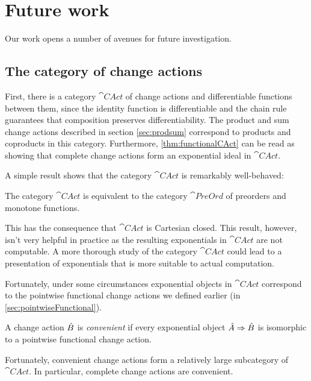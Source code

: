 \section{Future work}

Our work opens a number of avenues for future investigation.

\subsection{The category of change actions}

First, there is a category $\cat{CAct}$ of change actions and differentiable
functions between them, since the identity function is differentiable and the chain
rule guarantees that composition preserves differentiability. The product and sum change
actions described in section \cref{sec:prodsum} correspond to products and
coproducts in this category. Furthermore, \cref{thm:functionalCAct} can be
read as showing that complete change actions form an exponential ideal in $\cat{CAct}$.

A simple result shows that the category $\cat{CAct}$ is remarkably well-behaved:

\begin{theorem}
  The category $\cat{CAct}$ is equivalent to the category $\cat{PreOrd}$ of
  preorders and monotone functions.
\end{theorem}

This has the consequence that $\cat{CAct}$ is Cartesian closed.
This result, however, isn't very helpful in practice
as the resulting exponentials in $\cat{CAct}$ are not computable. A more thorough study
of the category $\cat{CAct}$ could lead to a presentation of exponentials that is more
suitable to actual computation.

Fortunately, under some circumstances exponential objects in $\cat{CAct}$ correspond
to the pointwise functional change actions we defined earlier (in \cref{sec:pointwiseFunctional}).

\begin{defn}
  \label{def:convenientChangeActions}
  A change action $\hat{B}$ is \emph{convenient} if every exponential object
  ${\hat{A}} \Rightarrow {\hat{B}}$ is isomorphic to a pointwise functional change action.
\end{defn}

Fortunately, convenient change actions form a relatively large subcategory of
$\cat{CAct}$. In particular, complete change actions are convenient.

